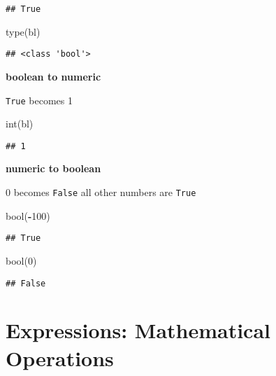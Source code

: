\documentclass[
]{book}
\newenvironment{Shaded}{\begin{snugshade}}{\end{snugshade}}
\newcommand{\BuiltInTok}[1]{#1}
\newcommand{\DecValTok}[1]{\textcolor[rgb]{0.00,0.00,0.81}{#1}}
\newcommand{\NormalTok}[1]{#1}
\newcommand{\OperatorTok}[1]{\textcolor[rgb]{0.81,0.36,0.00}{\textbf{#1}}}
\begin{document}
\begin{verbatim}
## True
\end{verbatim}

\begin{Shaded}
\begin{Highlighting}[]
\BuiltInTok{type}\NormalTok{(bl)}
\end{Highlighting}
\end{Shaded}

\begin{verbatim}
## <class 'bool'>
\end{verbatim}

\textbf{boolean to numeric}

\texttt{True} becomes 1

\begin{Shaded}
\begin{Highlighting}[]
\BuiltInTok{int}\NormalTok{(bl)}
\end{Highlighting}
\end{Shaded}

\begin{verbatim}
## 1
\end{verbatim}

\textbf{numeric to boolean}

0 becomes \texttt{False}
all other numbers are \texttt{True}

\begin{Shaded}
\begin{Highlighting}[]
\BuiltInTok{bool}\NormalTok{(}\OperatorTok{{-}}\DecValTok{100}\NormalTok{)}
\end{Highlighting}
\end{Shaded}

\begin{verbatim}
## True
\end{verbatim}

\begin{Shaded}
\begin{Highlighting}[]
\BuiltInTok{bool}\NormalTok{(}\DecValTok{0}\NormalTok{)}
\end{Highlighting}
\end{Shaded}

\begin{verbatim}
## False
\end{verbatim}

\hypertarget{expressions-mathematical-operations}{%
\section{Expressions: Mathematical Operations}\label{expressions-mathematical-operations}}
\end{document}
